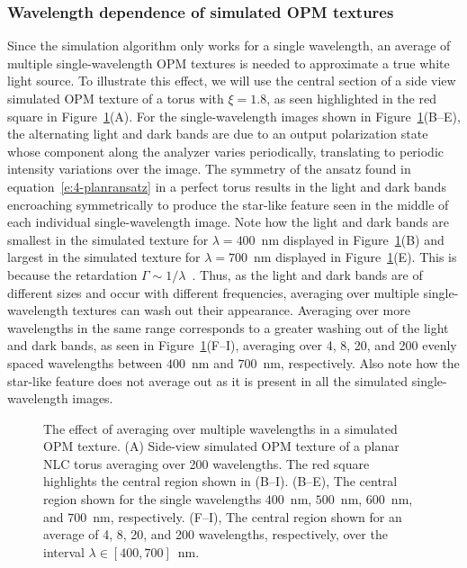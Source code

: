 \subsubsection{Wavelength dependence of simulated OPM textures}
Since the simulation algorithm only works for a single wavelength, an average of multiple single-wavelength OPM textures is needed to approximate a true white light source.
To illustrate this effect, we will use the central section of a side view simulated OPM texture of a torus with $\xi = 1.8$, as seen highlighted in the red square in Figure~\ref{fig_lambda}(A).
For the single-wavelength images shown in Figure~\ref{fig_lambda}(B--E), the alternating light and dark bands are due to an output polarization state whose component along the analyzer varies periodically, translating to periodic intensity variations over the image.
The symmetry of the ansatz found in equation~\ref{e:4-planransatz} in a perfect torus results in the light and dark bands encroaching symmetrically to produce the star-like feature seen in the middle of each individual single-wavelength image.
Note how the light and dark bands are smallest in the simulated texture for $\lambda = 400 $~nm displayed in Figure~\ref{fig_lambda}(B) and largest in the simulated texture for $\lambda = 700$~nm displayed in Figure~\ref{fig_lambda}(E).
This is because the retardation $\Gamma \sim 1/\lambda$~\cite{RN232}.
Thus, as the light and dark bands are of different sizes and occur with different frequencies, averaging over multiple single-wavelength textures can wash out their appearance.
Averaging over more wavelengths in the same range corresponds to a greater washing out of the light and dark bands, as seen in Figure~\ref{fig_lambda}(F--I), averaging over 4, 8, 20, and 200 evenly spaced wavelengths between $400$~nm and $700$~nm, respectively.
Also note how the star-like feature does not average out as it is present in all the simulated single-wavelength images.
\begin{figure}
\centering
\caption{The effect of averaging over multiple wavelengths in a simulated OPM texture.
(A) Side-view simulated OPM texture of a planar NLC torus averaging over 200 wavelengths.
The red square highlights the central region shown in (B--I).
(B--E), The central region shown for the single wavelengths $400$~nm, $500$~nm, $600$~nm, and $700$~nm, respectively.
(F--I), The central region shown for an average of 4, 8, 20, and 200 wavelengths, respectively, over the interval $\lambda \in [400,700]$~nm.}\label{fig_lambda}
\end{figure}


